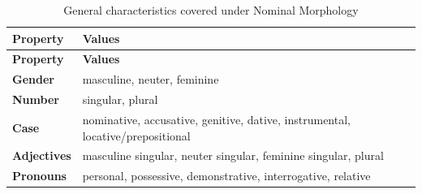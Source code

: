 \documentclass[
  a4paperpaper,
]{report}
\begin{document}
\begin{longtable}[]{@{}ll@{}}
\caption{General characteristics covered under Nominal
Morphology}\tabularnewline
\toprule
\begin{minipage}[b]{0.16\columnwidth}\raggedright
\textbf{Property}\strut
\end{minipage} & \begin{minipage}[b]{0.78\columnwidth}\raggedright
\textbf{Values}\strut
\end{minipage}\tabularnewline
\midrule
\endfirsthead
\toprule
\begin{minipage}[b]{0.16\columnwidth}\raggedright
\textbf{Property}\strut
\end{minipage} & \begin{minipage}[b]{0.78\columnwidth}\raggedright
\textbf{Values}\strut
\end{minipage}\tabularnewline
\midrule
\endhead
\begin{minipage}[t]{0.16\columnwidth}\raggedright
\textbf{Gender}\strut
\end{minipage} & \begin{minipage}[t]{0.78\columnwidth}\raggedright
masculine, neuter, feminine\strut
\end{minipage}\tabularnewline
\begin{minipage}[t]{0.16\columnwidth}\raggedright
\textbf{Number}\strut
\end{minipage} & \begin{minipage}[t]{0.78\columnwidth}\raggedright
singular, plural\strut
\end{minipage}\tabularnewline
\begin{minipage}[t]{0.16\columnwidth}\raggedright
\textbf{Case}\strut
\end{minipage} & \begin{minipage}[t]{0.78\columnwidth}\raggedright
nominative, accusative, genitive, dative, instrumental,
locative/prepositional\strut
\end{minipage}\tabularnewline
\begin{minipage}[t]{0.16\columnwidth}\raggedright
\textbf{Adjectives}\strut
\end{minipage} & \begin{minipage}[t]{0.78\columnwidth}\raggedright
masculine singular, neuter singular, feminine singular, plural\strut
\end{minipage}\tabularnewline
\begin{minipage}[t]{0.16\columnwidth}\raggedright
\textbf{Pronouns}\strut
\end{minipage} & \begin{minipage}[t]{0.78\columnwidth}\raggedright
personal, possessive, demonstrative, interrogative, relative\strut
\end{minipage}\tabularnewline
\bottomrule
\end{longtable}
\end{document}
